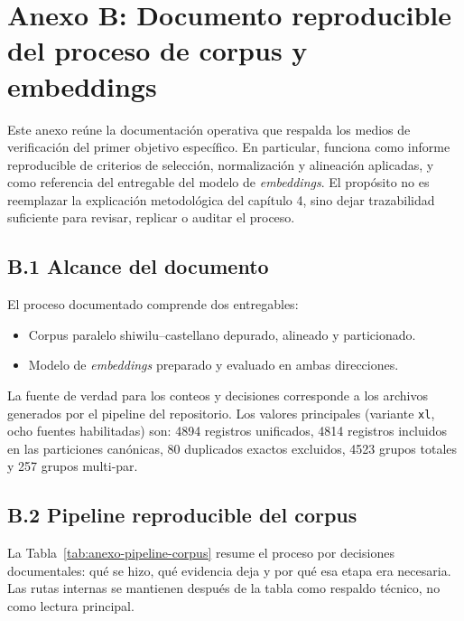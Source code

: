 \documentclass[12pt,a4paper,oneside]{book}
\begin{document}
\clearpage
{}
\section*{Anexo B: Documento reproducible del proceso de corpus y embeddings}\label{anexo-documento-reproducible}

Este anexo reúne la documentación operativa que respalda los medios de verificación del primer objetivo específico. En particular, funciona como informe reproducible de criterios de selección, normalización y alineación aplicadas, y como referencia del entregable del modelo de \emph{embeddings}. El propósito no es reemplazar la explicación metodológica del capítulo 4, sino dejar trazabilidad suficiente para revisar, replicar o auditar el proceso.

\subsection*{B.1 Alcance del documento}

El proceso documentado comprende dos entregables:

\begin{itemize}
\item
  Corpus paralelo shiwilu--castellano depurado, alineado y particionado.
\item
  Modelo de \emph{embeddings} preparado y evaluado en ambas direcciones.
\end{itemize}

La fuente de verdad para los conteos y decisiones corresponde a los archivos generados por el pipeline del repositorio. Los valores principales (variante \texttt{xl}, ocho fuentes habilitadas) son: 4894 registros unificados, 4814 registros incluidos en las particiones canónicas, 80 duplicados exactos excluidos, 4523 grupos totales y 257 grupos multi-par.

\subsection*{B.2 Pipeline reproducible del corpus}

La Tabla~\ref{tab:anexo-pipeline-corpus} resume el proceso por decisiones documentales: qué se hizo, qué evidencia deja y por qué esa etapa era necesaria. Las rutas internas se mantienen después de la tabla como respaldo técnico, no como lectura principal.
\end{document}
